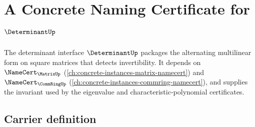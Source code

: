 \chapter{A Concrete Naming Certificate for $\DeterminantUp$}
\label{ch:concrete-instances-determinant-namecert}

The determinant interface $\DeterminantUp$ packages the alternating multilinear form on square matrices that detects invertibility. It depends on $\NameCert_{\MatrixUp}$ (\autoref{ch:concrete-instances-matrix-namecert}) and $\NameCert_{\CommRingUp}$ (\autoref{ch:concrete-instances-commring-namecert}), and supplies the invariant used by the eigenvalue and characteristic-polynomial certificates.

\section{Carrier definition}
\label{sec:determinant-carrier}

